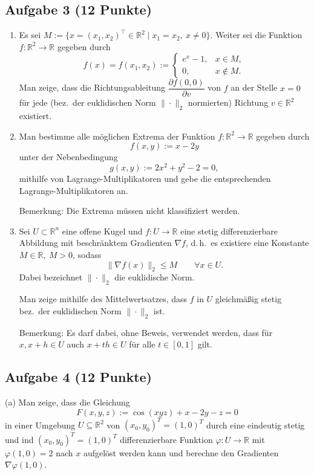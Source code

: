 \subsection*{Aufgabe 3 (12 Punkte)}
\begin{enumerate}
\item[(a)] Es sei \(M:=\{x=(x_1,x_2)^\top\in\mathbb{R}^2\mid x_1=x_2,\ x\neq 0\}\). Weiter sei die Funktion \(f:\mathbb{R}^2\to\mathbb{R}\) gegeben durch
\[
f(x)=f(x_1,x_2):=\begin{cases}
e^x - 1,& x\in M,\\[4pt]
0,& x\notin M.
\end{cases}
\]
Man zeige, dass die Richtungsableitung \(\dfrac{\partial f(0,0)}{\partial v}\) von \(f\) an der Stelle \(x=0\) für jede (bez.\ der euklidischen Norm \(\|\cdot\|_2\) normierten) Richtung \(v\in\mathbb{R}^2\) existiert.
\hfill {}

\item[(b)] Man bestimme alle möglichen Extrema der Funktion \(f:\mathbb{R}^2\to\mathbb{R}\) gegeben durch
\[
f(x,y):=x-2y
\]
unter der Nebenbedingung
\[
g(x,y):=2x^2+y^2-2=0,
\]
mithilfe von Lagrange-Multiplikatoren und gebe die entsprechenden Lagrange-Multiplikatoren an.

Bemerkung: Die Extrema müssen nicht klassifiziert werden.
\hfill {}

\item[(c)] Sei \(U\subset\mathbb{R}^n\) eine offene Kugel und \(f:U\to\mathbb{R}\) eine stetig differenzierbare Abbildung mit beschränktem Gradienten \(\nabla f\), d.\,h.\ es existiere eine Konstante \(M\in\mathbb{R},\ M>0\), sodass
\[
\|\nabla f(x)\|_2\le M\qquad\forall x\in U.
\]
Dabei bezeichnet \(\|\cdot\|_2\) die euklidische Norm.

Man zeige mithilfe des Mittelwertsatzes, dass \(f\) in \(U\) gleichmäßig stetig bez.\ der euklidischen Norm \(\|\cdot\|_2\) ist.

Bemerkung: Es darf dabei, ohne Beweis, verwendet werden, dass für \(x,x+h\in U\) auch \(x+th\in U\) für alle \(t\in[0,1]\) gilt.
\hfill {}
\end{enumerate}


\newpage
\subsection*{Aufgabe 4 (12 Punkte)}

(a) Man zeige, dass die Gleichung
\[
F(x,y,z):=\cos(xyz)+x-2y-z=0
\]
in einer Umgebung \(U\subseteq\mathbb{R}^2\) von \((x_0,y_0)^{T}=(1,0)^{T}\) durch eine eindeutig stetig und ind \((x_0,y_0)^{T}=(1,0)^{T}\) differenzierbare Funktion \(\varphi:U\to\mathbb{R}\) mit \(\varphi(1,0)=2\) nach \(x\) aufgelöst werden kann und berechne den Gradienten \(\nabla\varphi(1,0)\). 
\hfill {}

